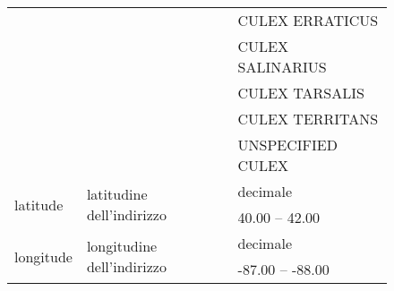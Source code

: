 \begin{figure}[H]
\begin{tabular}{lll}
		& & CULEX ERRATICUS \\
		& & CULEX SALINARIUS \\
		& & CULEX TARSALIS \\
		& & CULEX TERRITANS \\
		& & UNSPECIFIED CULEX  \\	\hline
		\multirow{2}{*}{latitude}				& \multirow{2}{*}{latitudine dell'indirizzo}	 &  decimale       \\ 
		& & {40.00} -- {42.00}  \\ \hline
		\multirow{2}{*}{longitude}				& \multirow{2}{*}{longitudine dell'indirizzo} &  decimale      	\\ 
		&& {-87.00} -- {-88.00} \\
		\bottomrule
	\end{tabular}
	\label{tab:attributi wnv}
\end{figure}


